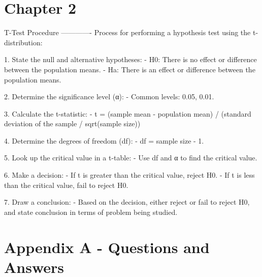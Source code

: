 \documentclass{article}
\theoremstyle{plain}
\theoremstyle{definition}
\theoremstyle{definition}
\begin{document}
\section{Chapter 2}
\begin{markdown}

T-Test Procedure
-------------
Process for performing a hypothesis test using the t-distribution:

1. State the null and alternative hypotheses: 
    - H0: There is no effect or difference between the population means. 
    - Ha: There is an effect or difference between the population means. 

2. Determine the significance level (α): 
    - Common levels: 0.05, 0.01.

3. Calculate the t-statistic: 
    - t = (sample mean - population mean) / (standard deviation of the sample / sqrt(sample size))

4. Determine the degrees of freedom (df): 
    - df = sample size - 1.

5. Look up the critical value in a t-table: 
    - Use df and α to find the critical value.

6. Make a decision: 
    - If t is greater than the critical value, reject H0. 
    - If t is less than the critical value, fail to reject H0.

7. Draw a conclusion: 
    - Based on the decision, either reject or fail to reject H0, and state conclusion in terms of problem being studied.

\end{markdown}

\section{Appendix A - Questions and Answers}
\end{document}
